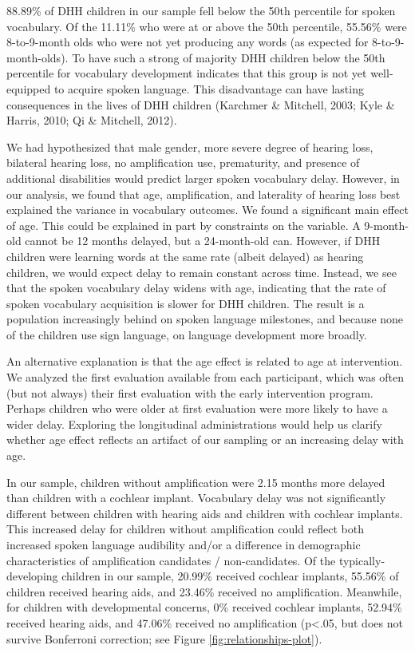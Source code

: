 \documentclass[
  english,
  man]{apa6}
\begin{document}
88.89\% of DHH children in our sample fell below the 50th percentile for spoken vocabulary. Of the 11.11\% who were at or above the 50th percentile, 55.56\% were 8-to-9-month olds who were not yet producing any words (as expected for 8-to-9-month-olds). To have such a strong of majority DHH children below the 50th percentile for vocabulary development indicates that this group is not yet well-equipped to acquire spoken language. This disadvantage can have lasting consequences in the lives of DHH children (Karchmer \& Mitchell, 2003; Kyle \& Harris, 2010; Qi \& Mitchell, 2012).

We had hypothesized that male gender, more severe degree of hearing loss, bilateral hearing loss, no amplification use, prematurity, and presence of additional disabilities would predict larger spoken vocabulary delay. However, in our analysis, we found that age, amplification, and laterality of hearing loss best explained the variance in vocabulary outcomes. We found a significant main effect of age. This could be explained in part by constraints on the variable. A 9-month-old cannot be 12 months delayed, but a 24-month-old can. However, if DHH children were learning words at the same rate (albeit delayed) as hearing children, we would expect delay to remain constant across time. Instead, we see that the spoken vocabulary delay widens with age, indicating that the rate of spoken vocabulary acquisition is slower for DHH children. The result is a population increasingly behind on spoken language milestones, and because none of the children use sign language, on language development more broadly.

An alternative explanation is that the age effect is related to age at intervention. We analyzed the first evaluation available from each participant, which was often (but not always) their first evaluation with the early intervention program. Perhaps children who were older at first evaluation were more likely to have a wider delay. Exploring the longitudinal administrations would help us clarify whether age effect reflects an artifact of our sampling or an increasing delay with age.

In our sample, children without amplification were 2.15 months more delayed than children with a cochlear implant. Vocabulary delay was not significantly different between children with hearing aids and children with cochlear implants. This increased delay for children without amplification could reflect both increased spoken language audibility and/or a difference in demographic characteristics of amplification candidates / non-candidates. Of the typically-developing children in our sample, 20.99\% received cochlear implants, 55.56\% of children received hearing aids, and 23.46\% received no amplification. Meanwhile, for children with developmental concerns, 0\% received cochlear implants, 52.94\% received hearing aids, and 47.06\% received no amplification (p\textless.05, but does not survive Bonferroni correction; see Figure \ref{fig:relationships-plot}).
\end{document}
